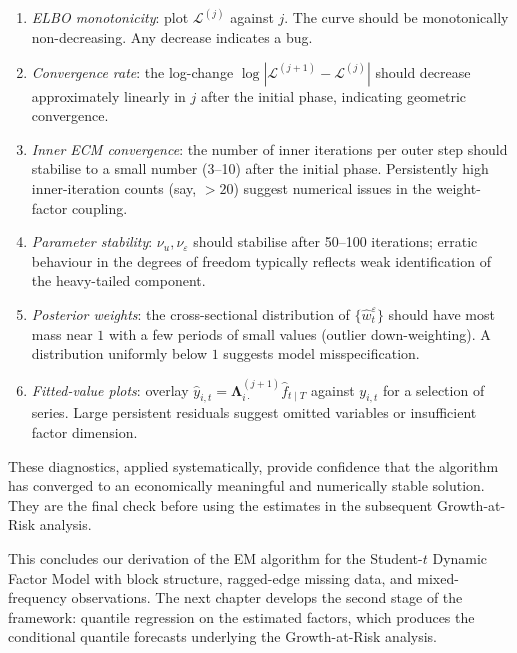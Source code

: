 \documentclass[11pt, a4paper, oneside]{article}
\newcommand{\mL}{\boldsymbol{\Lambda}}
\begin{document}
\begin{enumerate}[leftmargin=1.5em, itemsep=3pt]
    \item \emph{ELBO monotonicity}: plot $\mathcal{L}^{(j)}$ against
          $j$. The curve should be monotonically non-decreasing. Any
          decrease indicates a bug.
    \item \emph{Convergence rate}: the log-change
          $\log|\mathcal{L}^{(j+1)} - \mathcal{L}^{(j)}|$ should
          decrease approximately linearly in $j$ after the initial
          phase, indicating geometric convergence.
    \item \emph{Inner ECM convergence}: the number of inner iterations
          per outer step should stabilise to a small number (3--10)
          after the initial phase. Persistently high inner-iteration
          counts (say, $> 20$) suggest numerical issues in the
          weight-factor coupling.
    \item \emph{Parameter stability}: $\nu_u, \nu_\varepsilon$ should
          stabilise after 50--100 iterations; erratic behaviour in
          the degrees of freedom typically reflects weak identification
          of the heavy-tailed component.
    \item \emph{Posterior weights}: the cross-sectional distribution
          of $\{\hat{w}^\varepsilon_t\}$ should have most mass near
          $1$ with a few periods of small values (outlier
          down-weighting). A distribution uniformly below $1$ suggests
          model misspecification.
    \item \emph{Fitted-value plots}: overlay $\hat{y}_{i,t} = \mL^{(j+1)}_{i \cdot} \hat{f}_{t \mid T}$ against $y_{i,t}$ for a selection of series.
          Large persistent residuals suggest omitted variables or
          insufficient factor dimension.
\end{enumerate}

These diagnostics, applied systematically, provide confidence that
the algorithm has converged to an economically meaningful and
numerically stable solution. They are the final check before using
the estimates in the subsequent Growth-at-Risk analysis.

\bigskip

This concludes our derivation of the EM algorithm for the Student-$t$
Dynamic Factor Model with block structure, ragged-edge missing data,
and mixed-frequency observations. The next chapter develops the
second stage of the framework: quantile regression on the estimated
factors, which produces the conditional quantile forecasts
underlying the Growth-at-Risk analysis.
\end{document}
